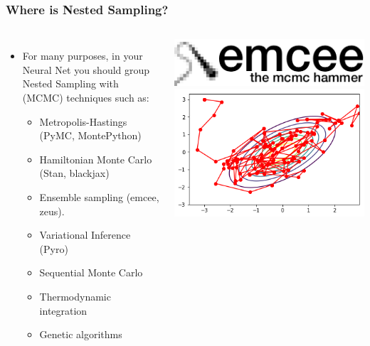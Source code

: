 \documentclass[aspectratio=169]{beamer}
\begin{document}
\begin{frame}
    \frametitle{Where is Nested Sampling?}
    \begin{columns}
        \begin{itemize}
            \item For many purposes, in your Neural Net you should group Nested Sampling with (MCMC) techniques such as:
                \begin{itemize}
                    \item Metropolis-Hastings (PyMC, MontePython)
                    \item Hamiltonian Monte Carlo (Stan, blackjax)
                    \item Ensemble sampling (emcee, zeus). 
                    \item Variational Inference (Pyro)
                    \item Sequential Monte Carlo 
                    \item Thermodynamic integration
                    \item Genetic algorithms
                \end{itemize}
            \end{itemize}
        \begin{columns}
        \includegraphics[width=\textwidth]{figures/emcee}
        \includegraphics[width=\textwidth]{figures/metropolis-hastings}

\end{columns}
\end{columns}
\end{frame}
\end{document}
